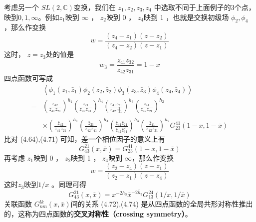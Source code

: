 考虑另一个 $SL(2,\mathbb{C}) $变换，我们在 $z_1,z_2,z_3,z_4$ 中选取不同于上面例子的3个点，映到$ 0,1,\infty $。例如$ z_1 $映到 $\infty$ ， $z_2 $映到 0 ， $z_4 $映到 1 ，也就是交换初级场 $\phi_2,\phi_4$ ，那么作变换
\begin{equation}
	w=\frac{\left(z_{4}-z_{1}\right)\left(z-z_{2}\right)}{\left(z_{4}-z_{2}\right)\left(z-z_{1}\right)}
\end{equation}
这时， $z=z_3 $处的值是
\begin{equation}
	w_{3}=\frac{z_{41} z_{32}}{z_{42} z_{31}}=1-x
\end{equation}
四点函数可写成
\begin{equation}
	\begin{aligned} &\left\langle\phi_{1}\left(z_{1}, \bar{z}_{1}\right) \phi_{2}\left(z_{2}, \bar{z}_{2}\right) \phi_{3}\left(z_{3}, \bar{z}_{3}\right) \phi_{4}\left(z_{4}, \bar{z}_{4}\right)\right\rangle \\ =&\left(\frac{z_{42}}{z_{41} z_{21}}\right)^{h_{1}}\left(\frac{z_{21}}{z_{42} z_{41}}\right)^{h_{4}}\left(\frac{z_{41} z_{21}}{z_{42} z_{31}^{2}}\right)^{h_{3}}\left(\frac{z_{41}}{z_{42} z_{21}}\right)^{h_{2}} \\ & \times\left(\frac{\bar{z}_{42}}{\bar{z}_{41} \bar{z}_{21}}\right)^{\bar{h}_{1}}\left(\frac{\bar{z}_{21}}{\bar{z}_{42} \bar{z}_{41}}\right)^{\bar{h}_{4}}\left(\frac{\bar{z}_{41} \bar{z}_{21}}{\bar{z}_{42} \bar{z}_{31}^{2}}\right)^{\bar{h}_{3}}\left(\frac{\bar{z}_{41}}{\bar{z}_{42} \bar{z}_{21}}\right)^{\bar{h}_{2}} G_{23}^{41}(1-x, 1-\bar{x}) \end{aligned}
\end{equation}
比对 (4.64),(4.71) 可知，差一个相位因子的意义上有
\begin{equation}
	G_{43}^{21}(x, \bar{x})=G_{23}^{41}(1-x, 1-\bar{x})
\end{equation}
再考虑 $z_1 $映到 0 ， $z_2 $映到 1 ， $z_4 $映到 $\infty$，那么作变换
\begin{equation}
	w=\frac{\left(z_{2}-z_{4}\right)\left(z-z_{1}\right)}{\left(z_{2}-z_{1}\right)\left(z-z_{4}\right)}
\end{equation}
这时$ z_3 $映到$ 1/x$ 。同理可得
\begin{equation}
	G_{43}^{21}(x, \bar{x})=x^{-2 h_{3}} \bar{x}^{-2 \bar{h}_{3}} G_{13}^{24}\left(1/x, 1/\bar{x}\right)
\end{equation}
关联函数 $G_{n m}^{l k}(x, \bar{x}) $间的关系 (4.72),(4.74) 是从四点函数的全局共形对称性推出的，这称为四点函数的\textbf{交叉对称性（crossing symmetry）}。

